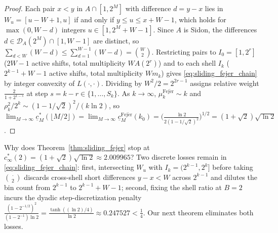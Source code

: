 \documentclass[11pt,reqno]{amsart}
\theoremstyle{definition}
\theoremstyle{remark}
\begin{document}
\begin{proof}
Each pair $x < y$ in $A \cap [1, 2^M]$ with difference $d = y - x$ lies in $W_u = [u - W + 1, u]$ if and only if $y \le u \le x + W - 1$, which holds for $\max(0, W - d)$ integers $u \in [1, 2^M + W - 1]$. Since $A$ is Sidon, the differences $d \in \mathcal{D}_A(2^M) \cap [1, W - 1]$ are distinct, so $\sum_{d < W} (W - d) \le \sum_{d=1}^{W-1} (W - d) = \binom{W}{2}$. Restricting pairs to $I_0 = [1, 2^r]$ ($2W - 1$ active shifts, total multiplicity $W A(2^r)$) and to each shell $I_k$ ($2^{k-1} + W - 1$ active shifts, total multiplicity $W m_k$) gives \eqref{eq:sliding_fejer_chain} by integer convexity of $L(\cdot, \cdot)$. Dividing by $W^2 / 2 = 2^{2r-1}$ assigns relative weight $\frac{2}{1 + 2^{1-s}}$ at step $s = k - r \in \{1, \dots, S_k\}$. As $k \to \infty$, $\mu_k^{\mathrm{Fej\acute{e}r}} \sim k$ and $\rho_k^2 / 2^k \sim (1 - 1/\sqrt{2})^2 / (k \ln 2)$, so $\lim_{M\to\infty} \underline{c}_M^*(\lfloor M/2\rfloor) = \lim_{M\to\infty} \underline{c}_M^{\mathrm{Fej\acute{e}r}}(k_0) = \bigl(\frac{\ln 2}{2(1 - 1/\sqrt{2})^2}\bigr)^{1/2} = (1 + \sqrt{2})\sqrt{\ln 2}$.
\end{proof}

Why does Theorem~\ref{thm:sliding_fejer} stop at $c_\infty^*(2) = (1 + \sqrt{2})\sqrt{\ln 2} \approx 2.009965$? Two discrete losses remain in \eqref{eq:sliding_fejer_chain}: first, intersecting $W_u$ with $I_k = (2^{k-1}, 2^k]$ before taking $\binom{\cdot}{2}$ discards cross-shell short differences $y - x < W$ across $2^{k-1}$ and dilutes the bin count from $2^{k-1}$ to $2^{k-1} + W - 1$; second, fixing the shell ratio at $B = 2$ incurs the dyadic step-discretization penalty $\frac{(1 - 2^{-1/2})^2}{(1 - 2^{-1})\ln 2} = \frac{\tanh((\ln 2)/4)}{\ln 2} \approx 0.247527 < \frac{1}{4}$. Our next theorem eliminates both losses.
\end{document}
